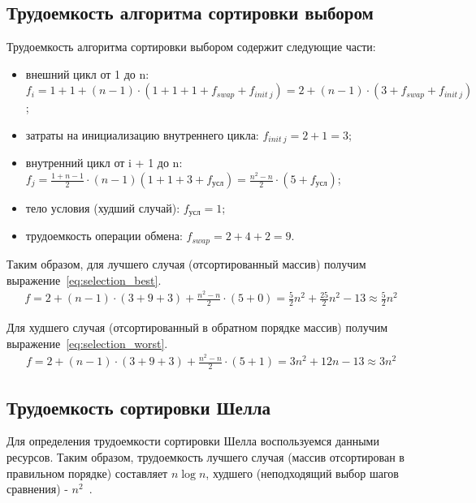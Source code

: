 \documentclass[12pt]{report}
\begin{document}
    \subsection{Трудоемкость алгоритма сортировки выбором}
    Трудоемкость алгоритма сортировки выбором содержит следующие части:
    \begin{itemize}
        \item внешний цикл от 1 до n: $f_i = 1 + 1 + (n - 1)\cdot(1 + 1 + 1 + f_{swap} + f_{init\ j}) =
        2 + (n - 1)\cdot(3 + f_{swap} + f_{init\ j})$;
        \item затраты на инициализацию внутреннего цикла: $f_{init\ j} = 2 + 1 = 3$;
        \item внутренний цикл от i + 1 до n: $f_j = \frac{1 + n - 1}{2} \cdot (n -1) (1 + 1 + 3 + f_{\text{усл}}) =
        \frac{n^2 - n}{2} \cdot(5 + f_{\text{усл}})$;
        \item тело условия (худший случай): $f_{\text{усл}} = 1$;
        \item трудоемкость операции обмена: $f_{swap} = 2 + 4 + 2 = 9$.
    \end{itemize}

    Таким образом, для лучшего случая (отсортированный массив) получим выражение~\ref{eq:selection_best}.
    \begin{equation}
        \label{eq:selection_best}
        \begin{array}{ll}
            f = 2 + (n - 1)\cdot(3 + 9 + 3) + \frac{n^2 - n}{2} \cdot(5 + 0) =
            \frac{5}{2} n^2 + \frac{25}{2}n^2 - 13 \approx \frac{5}{2}n^2
        \end{array}
    \end{equation}

    Для худшего случая (отсортированный в обратном порядке массив) получим выражение~\ref{eq:selection_worst}.
    \begin{equation}
        \label{eq:selection_worst}
        \begin{array}{ll}
            f = 2 + (n - 1)\cdot(3 + 9 + 3) + \frac{n^2 - n}{2} \cdot(5 + 1) = 3n^2 + 12n - 13 \approx 3n^2
        \end{array}
    \end{equation}

    \subsection{Трудоемкость сортировки Шелла}
    Для определения трудоемкости сортировки Шелла воспользуемся данными ресурсов.
    Таким образом, трудоемкость лучшего случая (массив отсортирован в правильном порядке) составляет $n\log n$,
    худшего (неподходящий выбор шагов сравнения) - $n^2$~\cite{ShellEff}.
\end{document}
